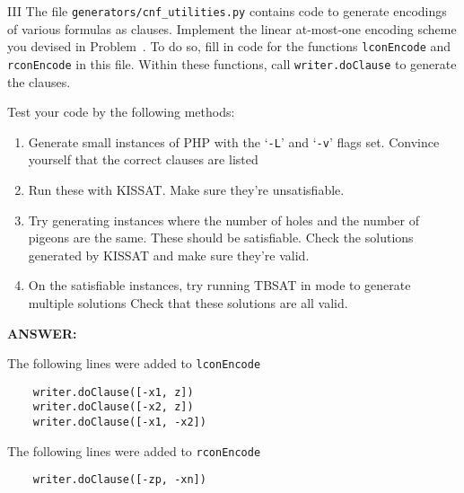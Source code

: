 \snewpage

\begin{problem}{III}
The file
\texttt{generators/cnf\_utilities.py} contains code
to generate encodings of various formulas as clauses.
Implement the linear at-most-one encoding scheme you devised in
Problem~.  To do so, fill in code for the functions
\texttt{lconEncode} and \texttt{rconEncode} in this file.
Within these functions, call
\texttt{writer.doClause} to generate the clauses.

Test your code by the following methods:
\begin{enumerate}
\item
Generate small instances of PHP with the `\texttt{-L}' and
`\texttt{-v}' flags set.  Convince yourself that the correct clauses are listed
\item
  Run these with KISSAT. Make sure they're unsatisfiable.
\item
  Try generating instances where the number of holes and the number of
  pigeons are the same.  These should be satisfiable.  Check the
  solutions generated by KISSAT and make sure they're valid.
\item
  On the satisfiable instances, try running TBSAT in mode to generate multiple solutions
  Check that these solutions are all valid.
\end{enumerate}
\ifshowsolutions
{\bf ANSWER:}

The following lines were added to \texttt{lconEncode}
\begin{lstlisting}
    writer.doClause([-x1, z])
    writer.doClause([-x2, z])
    writer.doClause([-x1, -x2])
\end{lstlisting}
The following lines were added to \texttt{rconEncode}
\begin{lstlisting}
    writer.doClause([-zp, -xn])
\end{lstlisting}
\fi

\end{problem}

\newpage

